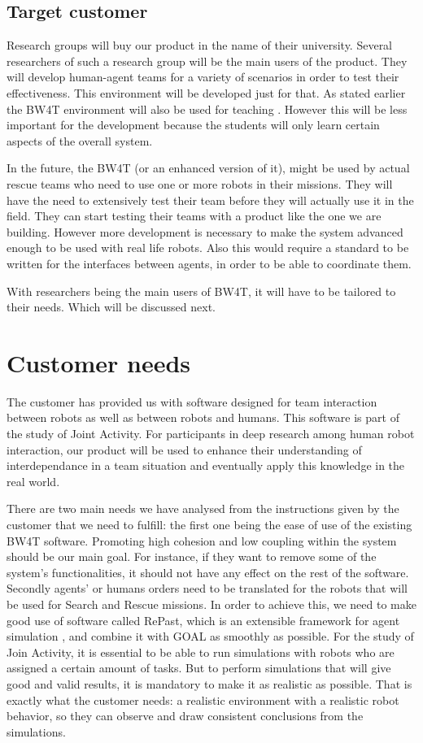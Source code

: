 \documentclass[oneside]{tudelft-report}
\begin{document}
\subsection{Target customer}
Research groups will buy our product in the name of their university. Several researchers of such a research group will be the main users of the product. They will develop human-agent teams for a variety of scenarios in order to test their effectiveness. This environment will be developed just for that. As stated earlier the BW4T environment will also be used for teaching \cite{lecture}. However this will be less important for the development because the students will only learn certain aspects of the overall system. 

In the future, the BW4T (or an enhanced version of it), might be used by actual rescue teams who need to use one or more robots in their missions. They will have the need to extensively test their team before they will actually use it in the field. They can start testing their teams with a product like the one we are building. However more development is necessary to make the system advanced enough to be used with real life robots. Also this would require a standard to be written for the interfaces between agents, in order to be able to coordinate them. 

With researchers being the main users of BW4T, it will have to be tailored to their needs. Which will be discussed next.

\section{Customer needs}
The customer has provided us with software designed for team interaction between robots as well as between robots and humans. This software is part of the study of Joint Activity. For participants in deep research among human robot interaction, our product will be used to enhance their understanding of interdependance in a team situation and eventually apply this knowledge in the real world.

There are two main needs we have analysed from the instructions given by the customer \cite{context} that we need to fulfill: the first one being the ease of use of the existing BW4T software. Promoting high cohesion and low coupling within the system should be our main goal. For instance, if they want to remove some of the system's functionalities, it should not have any effect on the rest of the software. Secondly agents’ or humans orders need to be translated for the robots that will be used for Search and Rescue missions. In order to achieve this, we need to make good use of software called RePast, which is an extensible framework for agent simulation \cite{repast}, and combine it with GOAL as smoothly as possible. For the study of Join Activity, it is essential to be able to run simulations with robots who are assigned a certain amount of tasks. But to perform simulations that will give good and valid results, it is mandatory to make it as realistic as possible. That is exactly what the customer needs: a realistic environment with a realistic robot behavior, so they can observe and draw consistent conclusions from the simulations.
\end{document}
